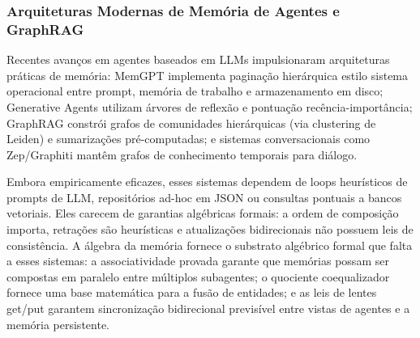 \documentclass[11pt,a4paper]{article}
\theoremstyle{definition}
\begin{document}
\subsubsection{Arquiteturas Modernas de Mem\'oria de Agentes e GraphRAG}
Recentes avan\c{c}os em agentes baseados em LLMs impulsionaram arquiteturas pr\'aticas de mem\'oria: MemGPT \cite{packer2023memgpt} implementa pagina\c{c}\~ao hier\'arquica estilo sistema operacional entre prompt, mem\'oria de trabalho e armazenamento em disco; Generative Agents \cite{park2023generative} utilizam \'arvores de reflex\~ao e pontua\c{c}\~ao rec\^encia-import\^ancia; GraphRAG \cite{edge2024local} constr\'oi grafos de comunidades hier\'arquicas (via clustering de Leiden) e sumariza\c{c}\~oes pr\'e-computadas; e sistemas conversacionais como Zep/Graphiti mant\^em grafos de conhecimento temporais para di\'alogo.

Embora empiricamente eficazes, esses sistemas dependem de loops heur\'isticos de prompts de LLM, reposit\'orios ad-hoc em JSON ou consultas pontuais a bancos vetoriais. Eles carecem de garantias alg\'ebricas formais: a ordem de composi\c{c}\~ao importa, retra\c{c}\~oes s\~ao heur\'isticas e atualiza\c{c}\~oes bidirecionais n\~ao possuem leis de consist\^encia. A \'algebra da mem\'oria fornece o substrato alg\'ebrico formal que falta a esses sistemas: a associatividade provada garante que mem\'orias possam ser compostas em paralelo entre m\'ultiplos subagentes; o quociente coequalizador fornece uma base matem\'atica para a fus\~ao de entidades; e as leis de lentes get/put garantem sincroniza\c{c}\~ao bidirecional previs\'ivel entre vistas de agentes e a mem\'oria persistente.
\end{document}
